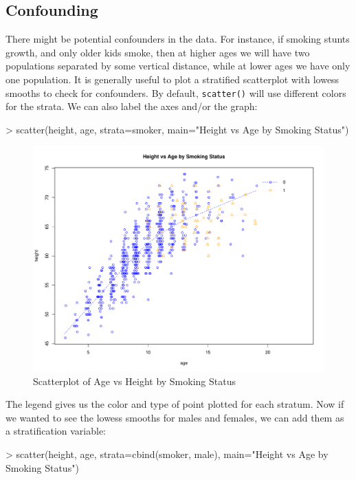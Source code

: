 \documentclass[landscape]{article}
\renewenvironment{Schunk}{\vspace{\topsep}}{\vspace{\topsep}}
\begin{document}
\subsection{Confounding}
There might be potential confounders in the data. For instance, if smoking stunts growth, and only older kids smoke, then at higher ages we will have two populations separated by some vertical distance, while at lower ages we have only one population. It is generally useful to plot a stratified scatterplot with lowess smooths to check for confounders. By default, \texttt{scatter()} will use different colors for the strata. We can also label the axes and/or the graph:\\
\begin{Schunk}
\begin{Sinput}
> scatter(height, age, strata=smoker, main="Height vs Age by Smoking Status")
\end{Sinput}
\end{Schunk}
\begin{figure}[h]
\centering
\includegraphics[scale=.005]{fevdoc-smokescatter}
\caption{Scatterplot of Age vs Height by Smoking Status}
\label{smokescatter}
\end{figure}
The legend gives us the color and type of point plotted for each stratum. Now if we wanted to see the lowess smooths for males and females, we can add them as a stratification variable: 
\begin{Schunk}
\begin{Sinput}
> scatter(height, age, strata=cbind(smoker, male), main="Height vs Age by Smoking Status")
\end{Sinput}
\end{Schunk}
\end{document}
